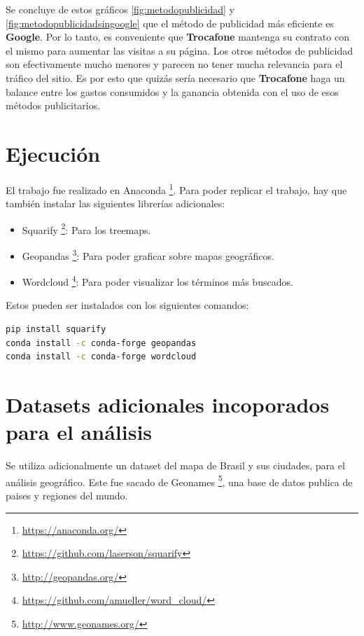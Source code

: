 \documentclass[a4paper]{article}
\begin{document}
Se concluye de estos gráficos \ref{fig:metodopublicidad} y \ref{fig:metodopublicidadsingoogle} que el método de publicidad más eficiente es \textbf{Google}. Por lo tanto, es conveniente que \textbf{Trocafone} mantenga su contrato con el mismo para aumentar las visitas a su página. Los otros métodos de publicidad son efectivamente mucho menores y parecen no tener mucha relevancia para el tráfico del sitio. Es por esto que quizás sería necesario que \textbf{Trocafone} haga un balance entre los gastos consumidos y la ganancia obtenida con el uso de esos métodos publicitarios.

\newpage
\appendix

\section{Ejecución}

El trabajo fue realizado en Anaconda \footnote{\url{https://anaconda.org/}}. Para poder replicar el trabajo, hay que también instalar las siguientes librerías adicionales:

\begin{itemize}
	\item{Squarify \footnote{\url{https://github.com/laserson/squarify}}: Para los treemaps.}
	\item{Geopandas \footnote{\url{http://geopandas.org/}}: Para poder graficar sobre mapas geográficos.}
	\item{Wordcloud \footnote{\url{https://github.com/amueller/word_cloud/}}: Para poder visualizar los términos más buscados.}
\end{itemize}

Estos pueden ser instalados con los siguientes comandos: 
\begin{lstlisting}[language=sh]
pip install squarify
conda install -c conda-forge geopandas
conda install -c conda-forge wordcloud
\end{lstlisting}

\section{Datasets adicionales incoporados para el análisis}

Se utiliza adicionalmente un dataset del mapa de Brasil y sus ciudades, para el análisis geográfico. Este fue sacado de  Geonames \footnote{\url{http://www.geonames.org/}}, una base de datos publica de paises y regiones del mundo.
\end{document}
